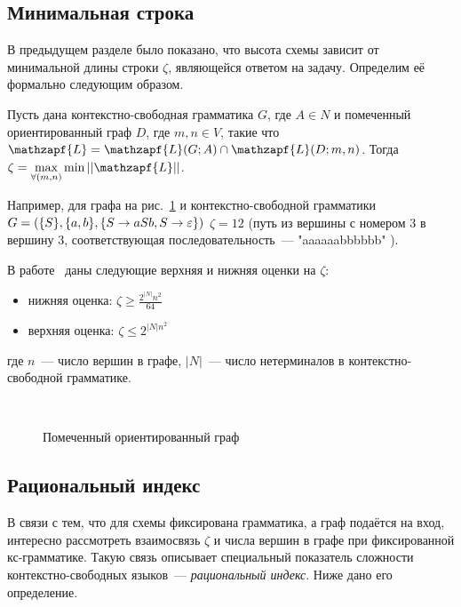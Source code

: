 \subsection{Минимальная строка}
В предыдущем разделе было показано, что высота схемы зависит от минимальной длины строки $\zeta$, являющейся ответом на задачу. Определим её формально следующим образом.

Пусть дана контекстно-свободная грамматика $G$, где $A \in N$ и помеченный ориентированный граф $D$, где $m, n \in V$, такие что $\mathzapf{L} = \mathzapf{L}(G; A) \cap \mathzapf{L}(D; m, n)$. Тогда $\zeta = \max\limits_{\forall(m,n)}\min ||\mathzapf{L}||$.

Например, для графа на рис.~\ref{graph} и контекстно-свободной грамматики $G = (\{S\}, \{a, b\},\\ \{S \rightarrow aSb,
S \rightarrow \varepsilon\})$ $\zeta = 12$ (путь из вершины с номером 3 в вершину 3, соответствующая последовательность~--- "aaaaaabbbbbb" ).

В работе~\cite{HellingsCFPQ} даны следующие верхняя и нижняя оценки на $\zeta$:
\begin{itemize}
\item нижняя оценка: $\zeta \ge \frac{2^{|N|}n^2}{64} $
\item верхняя оценка: $\zeta \le 2^{|N|n^2}$
\end{itemize}
где $n$~--- число вершин в графе, $|N|$~--- число нетерминалов в контекстно-свободной грамматике.
\begin{figure}
\centering

\\
	\caption{Помеченный ориентированный граф}
\label{graph}
\end{figure}
\subsection{Рациональный индекс}
В связи с тем, что для схемы фиксирована грамматика, а граф подаётся на вход, интересно рассмотреть взаимосвязь $\zeta$ и числа вершин в графе при фиксированной кс-грамматике.
Такую связь описывает специальный показатель сложности контекстно-свободных языков~--- \textit{рациональный индекс}. Ниже дано его определение.

